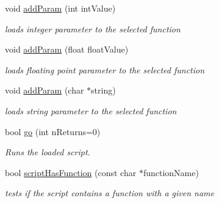 \begin{CompactItemize}
void \hyperlink{classEOSLuaScript_a939a1d1daa1326a012e5e60e1b45f95}{addParam} (int intValue)
\begin{CompactList}\small\item\em loads integer parameter to the selected function \item\end{CompactList}\item 
void \hyperlink{classEOSLuaScript_1a6ac1c2783c000b1cf57b3a09c04cfc}{addParam} (float floatValue)
\begin{CompactList}\small\item\em loads floating point parameter to the selected function \item\end{CompactList}\item 
void \hyperlink{classEOSLuaScript_9a6e58cbb890391a8eb34cf22a0e7cfd}{addParam} (char $\ast$string)
\begin{CompactList}\small\item\em loads string parameter to the selected function \item\end{CompactList}\item 
bool \hyperlink{classEOSLuaScript_6d24519473b5a583d3ce89252a11e0ce}{go} (int nReturns=0)
\begin{CompactList}\small\item\em Runs the loaded script. \item\end{CompactList}\item 
bool \hyperlink{classEOSLuaScript_466d88c9afeec258536cd069b811f325}{scriptHasFunction} (const char $\ast$functionName)
\begin{CompactList}\small\item\em tests if the script contains a function with a given name \item\end{CompactList}\end{CompactItemize}
